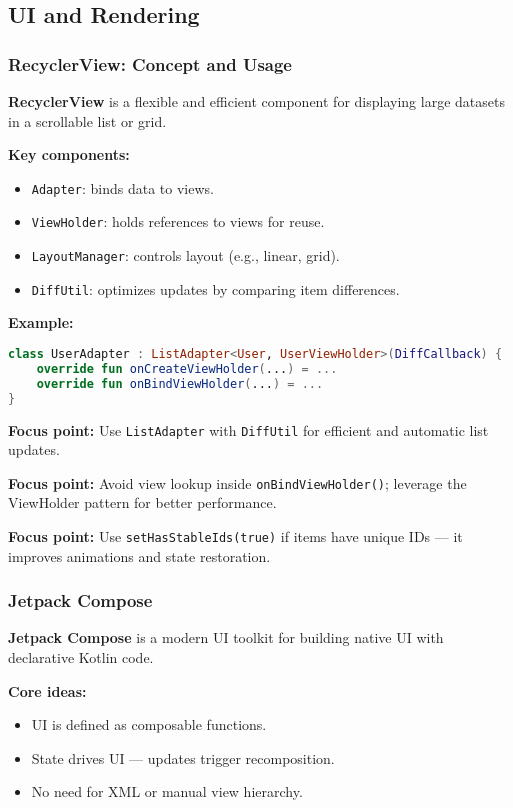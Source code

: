 \documentclass[a4paper,12pt]{article}
\begin{document}
\subsection{UI and Rendering}

\subsubsection{RecyclerView: Concept and Usage}

\textbf{RecyclerView} is a flexible and efficient component for displaying large datasets in a scrollable list or grid.

\textbf{Key components:}
\begin{itemize}
  \item \texttt{Adapter}: binds data to views.
  \item \texttt{ViewHolder}: holds references to views for reuse.
  \item \texttt{LayoutManager}: controls layout (e.g., linear, grid).
  \item \texttt{DiffUtil}: optimizes updates by comparing item differences.
\end{itemize}

\textbf{Example:}
\begin{lstlisting}[language=Kotlin]
class UserAdapter : ListAdapter<User, UserViewHolder>(DiffCallback) {
    override fun onCreateViewHolder(...) = ...
    override fun onBindViewHolder(...) = ...
}
\end{lstlisting}

\textbf{Focus point:} Use \texttt{ListAdapter} with \texttt{DiffUtil} for efficient and automatic list updates.

\textbf{Focus point:} Avoid view lookup inside \texttt{onBindViewHolder()}; leverage the ViewHolder pattern for better performance.

\textbf{Focus point:} Use \texttt{setHasStableIds(true)} if items have unique IDs — it improves animations and state restoration.

\subsubsection{Jetpack Compose}

\textbf{Jetpack Compose} is a modern UI toolkit for building native UI with declarative Kotlin code.

\textbf{Core ideas:}
\begin{itemize}
  \item UI is defined as composable functions.
  \item State drives UI — updates trigger recomposition.
  \item No need for XML or manual view hierarchy.
\end{itemize}
\end{document}
